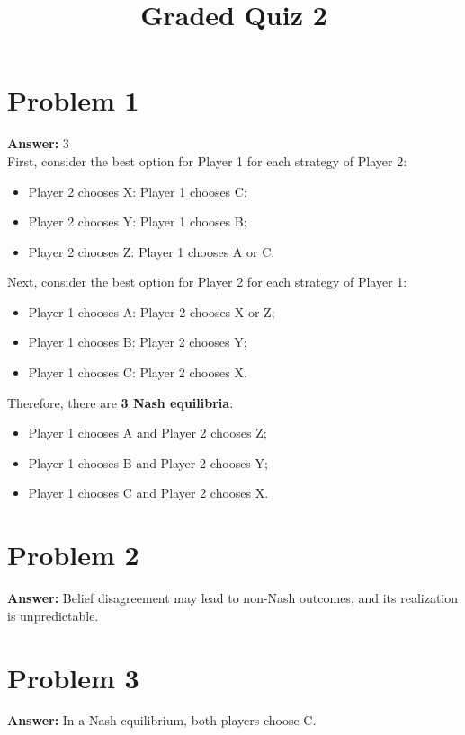 \documentclass[11pt]{article}
\date{}
\title{Graded Quiz 2}
\begin{document}
\thispagestyle{empty}
\pagestyle{empty}
\section*{Problem 1}
\label{sec:org57cd1c6}

\textbf{Answer:} 3\\

First, consider the best option for Player 1 for each strategy of Player 2:
\begin{itemize}
\item Player 2 chooses X: Player 1 chooses C;
\item Player 2 chooses Y: Player 1 chooses B;
\item Player 2 chooses Z: Player 1 chooses A or C.
\end{itemize}
Next, consider the best option for Player 2 for each strategy of Player 1:
\begin{itemize}
\item Player 1 chooses A: Player 2 chooses X or Z;
\item Player 1 chooses B: Player 2 chooses Y;
\item Player 1 chooses C: Player 2 chooses X.
\end{itemize}
Therefore, there are \textbf{3 Nash equilibria}:
\begin{itemize}
\item Player 1 chooses A and Player 2 chooses Z;
\item Player 1 chooses B and Player 2 chooses Y;
\item Player 1 chooses C and Player 2 chooses X.
\end{itemize}
\section*{Problem 2}
\label{sec:org47f38fa}

\textbf{Answer:} Belief disagreement may lead to non-Nash outcomes, and its realization
is unpredictable.
\section*{Problem 3}
\label{sec:org40e5613}

\textbf{Answer:} In a Nash equilibrium, both players choose C.\\
\end{document}

